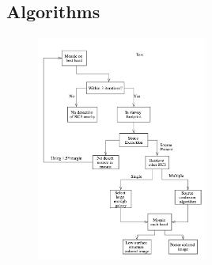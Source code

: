 \documentclass[5p]{elsarticle}
\begin{document}
	\subsection{Algorithms}
		\begin{figure}[h]
		\includegraphics[width=0.5\textwidth]{figures/algorithm}
	\end{figure}
\end{document}
